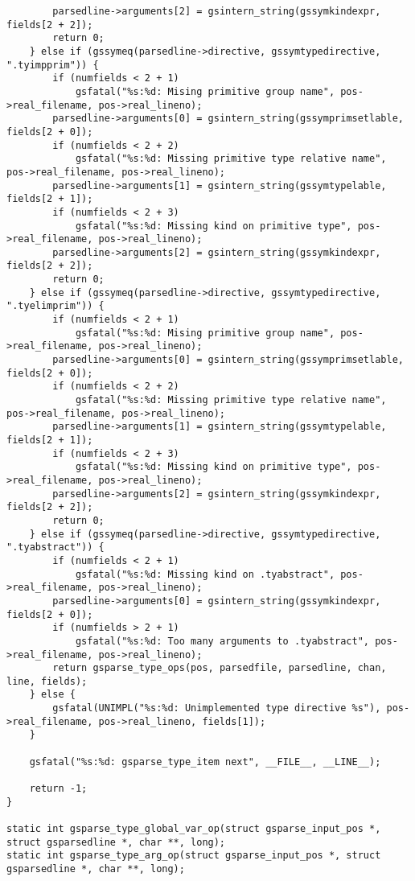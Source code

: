\documentclass{report}
\begin{document}
\begin{verbatim}
        parsedline->arguments[2] = gsintern_string(gssymkindexpr, fields[2 + 2]);
        return 0;
    } else if (gssymeq(parsedline->directive, gssymtypedirective, ".tyimpprim")) {
        if (numfields < 2 + 1)
            gsfatal("%s:%d: Mising primitive group name", pos->real_filename, pos->real_lineno);
        parsedline->arguments[0] = gsintern_string(gssymprimsetlable, fields[2 + 0]);
        if (numfields < 2 + 2)
            gsfatal("%s:%d: Missing primitive type relative name", pos->real_filename, pos->real_lineno);
        parsedline->arguments[1] = gsintern_string(gssymtypelable, fields[2 + 1]);
        if (numfields < 2 + 3)
            gsfatal("%s:%d: Missing kind on primitive type", pos->real_filename, pos->real_lineno);
        parsedline->arguments[2] = gsintern_string(gssymkindexpr, fields[2 + 2]);
        return 0;
    } else if (gssymeq(parsedline->directive, gssymtypedirective, ".tyelimprim")) {
        if (numfields < 2 + 1)
            gsfatal("%s:%d: Mising primitive group name", pos->real_filename, pos->real_lineno);
        parsedline->arguments[0] = gsintern_string(gssymprimsetlable, fields[2 + 0]);
        if (numfields < 2 + 2)
            gsfatal("%s:%d: Missing primitive type relative name", pos->real_filename, pos->real_lineno);
        parsedline->arguments[1] = gsintern_string(gssymtypelable, fields[2 + 1]);
        if (numfields < 2 + 3)
            gsfatal("%s:%d: Missing kind on primitive type", pos->real_filename, pos->real_lineno);
        parsedline->arguments[2] = gsintern_string(gssymkindexpr, fields[2 + 2]);
        return 0;
    } else if (gssymeq(parsedline->directive, gssymtypedirective, ".tyabstract")) {
        if (numfields < 2 + 1)
            gsfatal("%s:%d: Missing kind on .tyabstract", pos->real_filename, pos->real_lineno);
        parsedline->arguments[0] = gsintern_string(gssymkindexpr, fields[2 + 0]);
        if (numfields > 2 + 1)
            gsfatal("%s:%d: Too many arguments to .tyabstract", pos->real_filename, pos->real_lineno);
        return gsparse_type_ops(pos, parsedfile, parsedline, chan, line, fields);
    } else {
        gsfatal(UNIMPL("%s:%d: Unimplemented type directive %s"), pos->real_filename, pos->real_lineno, fields[1]);
    }

    gsfatal("%s:%d: gsparse_type_item next", __FILE__, __LINE__);

    return -1;
}

static int gsparse_type_global_var_op(struct gsparse_input_pos *, struct gsparsedline *, char **, long);
static int gsparse_type_arg_op(struct gsparse_input_pos *, struct gsparsedline *, char **, long);


\end{verbatim}
\end{document}
